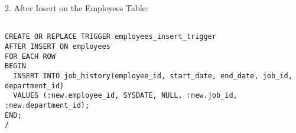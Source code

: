 \documentclass[11pt]{article} %
\begin{document}
2. After Insert on the Employees Table:

\begin{small}
\begin{verbatim}

CREATE OR REPLACE TRIGGER employees_insert_trigger
AFTER INSERT ON employees
FOR EACH ROW
BEGIN
  INSERT INTO job_history(employee_id, start_date, end_date, job_id, department_id)
  VALUES (:new.employee_id, SYSDATE, NULL, :new.job_id, :new.department_id);
END;
/

\end{verbatim}
\end{small}
\end{document}
